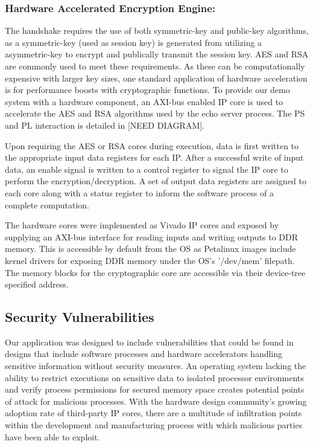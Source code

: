 \documentclass[sigconf]{acmart}
\theoremstyle{plain}
\theoremstyle{remark}
\begin{document}
\subsubsection{Hardware Accelerated Encryption Engine:}
The handshake requires the use of both symmetric-key and public-key algorithms, as a symmetric-key (used as session key) is generated from utilizing a asymmetric-key to encrypt and publically transmit the session key. AES and RSA are commonly used to meet these requirements. As these can be computationally expensive with larger key sizes, one standard application of hardware acceleration is for performance boosts with cryptographic functions. To provide our demo system with a hardware component, an AXI-bus enabled IP core is used to accelerate the AES and RSA algorithms used by the echo server process. The PS and PL interaction is detailed in [NEED DIAGRAM].

Upon requiring the AES or RSA cores during execution, data is first written to the appropriate input data registers for each IP. After a successful write of input data, an enable signal is written to a control register to signal the IP core to perform the encryption/decryption. A set of output data registers are assigned to each core along with a status register to inform the software process of a complete computation.

The hardware cores were implemented as Vivado IP cores and exposed by supplying an AXI-bus interface for reading inputs and writing outputs to DDR memory. This is accessible by default from the OS as Petalinux images include kernel drivers for exposing DDR memory under the OS's '/dev/mem' filepath. The memory blocks for the cryptographic core are accessible via their device-tree specified address.



\subsection{Security Vulnerabilities}

Our application was designed to include vulnerabilities that could be found in designs that include software processes and hardware accelerators handling sensitive information without security measures. An operating system lacking the ability to restrict executions on sensitive data to isolated processor environments and verify process permissions for secured memory space creates potential points of attack for malicious processes. With the hardware design community's growing adoption rate of third-party IP cores, there are a multitude of infiltration points within the development and manufacturing process with which malicious parties have been able to exploit.
\end{document}
